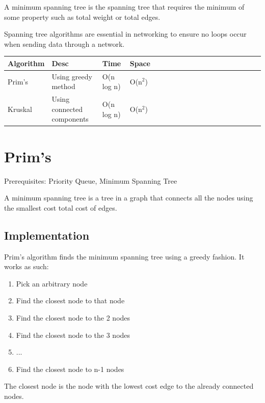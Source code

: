 \documentclass[11pt,oneside]{book}
\begin{document}
A minimum spanning tree is the spanning tree that requires the minimum of some property such as total weight or total edges.

Spanning tree algorithms are essential in networking to ensure no loops occur when sending data through a network.

\vspace{10pt} \begin{tabulary}{0.4\linewidth}{|l|l|l|l|l|l|l|l|l|l|l|l|l|l|l|l|l|l|l}\hline


  Algorithm &
  Desc &
  Time &
  Space\\
\hline


  Prim's &
  Using greedy method &
  O(n log n) &
  O(n$^{2}$)\\

  Kruskal &
  Using connected components &
  O(n log n) &
  O(n$^{2}$)\\

\hline\end{tabulary}



        \section{ Prim's }
        Prerequisites:  Priority Queue, Minimum Spanning Tree

A minimum spanning tree is a tree in a graph that connects all the nodes using the smallest cost total cost of edges.

\subsection{Implementation}

Prim's algorithm finds the minimum spanning tree using a greedy fashion. It works as such:

\begin{enumerate}
\item Pick an arbitrary node
\item Find the closest node to that node
\item Find the closest node to the 2 nodes
\item Find the closest node to the 3 nodes
\item ...
\item Find the closest node to n-1 nodes
\end{enumerate}

The closest node is the node with the lowest cost edge to the already connected nodes.
\end{document}
